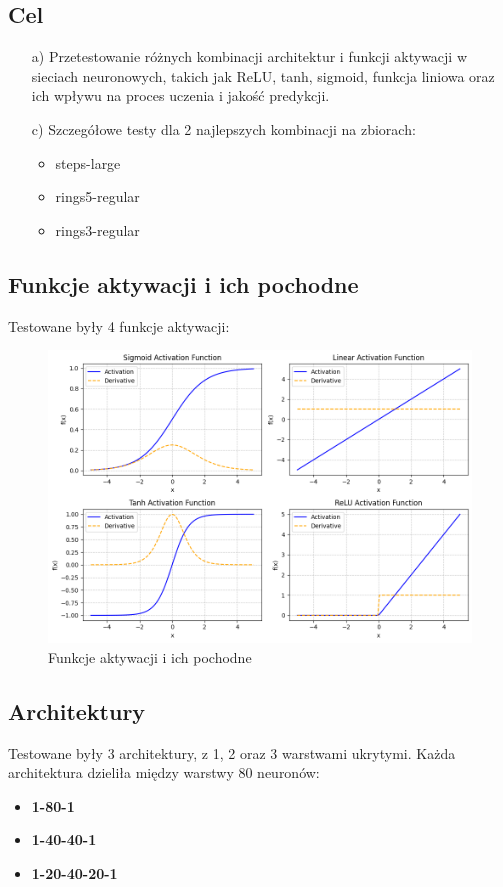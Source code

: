 \documentclass{article}
\begin{document}
\subsection*{Cel}
\begin{enumerate}
    \item[a)] Przetestowanie różnych kombinacji architektur i funkcji aktywacji w sieciach neuronowych, takich jak ReLU, tanh, sigmoid, funkcja liniowa oraz ich wpływu na proces uczenia i jakość predykcji.
    \item[c)] Szczegółowe testy dla 2 najlepszych kombinacji na zbiorach:
    \item[] \begin{itemize}
        \item steps-large
        \item rings5-regular
        \item rings3-regular
    \end{itemize}
\end{enumerate}

\subsection*{Funkcje aktywacji i ich pochodne}
Testowane były 4 funkcje aktywacji:
\begin{figure}[H]
    \centering
    \includegraphics[width=\textwidth]{img/nn5/pochodne.png}
    \caption{Funkcje aktywacji i ich pochodne}
\end{figure}

\subsection*{Architektury}
Testowane były 3 architektury, z 1, 2 oraz 3 warstwami ukrytymi. Każda architektura dzieliła między warstwy 80 neuronów:
\begin{itemize}
    \item \textbf{1-80-1}
    \item \textbf{1-40-40-1}
    \item \textbf{1-20-40-20-1}
\end{itemize}
\end{document}
